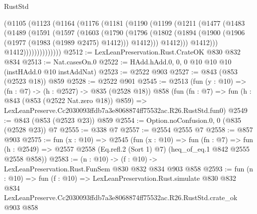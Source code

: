 \begin{lexlean}{RustStd}
\begin{coremodule}
            (@1105
              (@1123
                (@1164
                  (@1176
                    (@1181
                      (@1190
                        (@1199
                          (@1211
                            (@1477
                              (@1483
                                (@1489
                                  (@1591
                                    (@1597
                                      (@1603
                                        (@1790
                                          (@1796
                                            (@1802
                                              (@1894
                                                (@1900
                                                  (@1906 (@1977 (@1983 (@1989 @2475) @1412)))
                                                  @1412)))
                                            @1412)))
                                      @1412)))
                                @1412))))))))))))))
@2512 := LexLeanPreservation.Rust.CrateOK @830 @832 @834
@2513 := Nat.casesOn.{0}
@2522 := HAdd.hAdd.{0, 0, 0} @10 @10 @10 (instHAdd.{0} @10 instAddNat)
@2523 := @2522 @903
@2527 := @843 (@853 (@2523 @18)) @859
@2528 := @2522 @901
@2545 := @2513
    (fun (y : @10) => (fn : @7) -> (h : @2527) -> @835 (@2528 @18))
    @858
    (fun (fn : @7) =>
    fun (h : @843 (@853 (@2522 Nat.zero @18)) @859) =>
    LexLeanPreserve.Cc2030093ffdb7a3e8068874ff75532ac.R26.RustStd.fun0)
@2549 := @843 (@853 (@2523 @23)) @859
@2554 := Option.noConfusion.{0, 0} (@835 (@2528 @23)) @7
@2555 := @338 @7
@2557 := @2554 @2555 @7
@2558 := @857 @903
@2575 := fun (x : @10) =>
  @2545
    (fun (x : @10) =>
    fun (fn : @7) =>
    fun (h : @2549) => @2557 @2558 (Eq.refl.{2} (Sort 1) @7) (heq_of_eq.{1} @842 @2555 @2558 @858))
@2583 := (n : @10) -> (f : @10) -> LexLeanPreservation.Rust.FunSem @830 @832 @834 @903 @858
@2593 := fun (n : @10) =>
  fun (f : @10) =>
  LexLeanPreservation.Rust.simulate
    @830
    @832
    @834
    LexLeanPreserve.Cc2030093ffdb7a3e8068874ff75532ac.R26.RustStd.crate_ok
    @903
    @858
\end{coremodule}
\end{lexlean}
